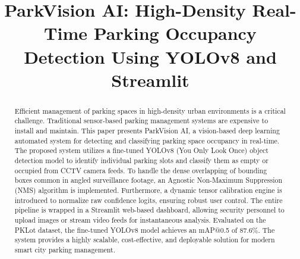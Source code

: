 \documentclass[conference]{IEEEtran}
\begin{document}
\title{ParkVision AI: High-Density Real-Time Parking Occupancy Detection Using YOLOv8 and Streamlit\\}

\author{
\and
{}
\and
{}
\and
{}
}

\maketitle

\begin{abstract}
Efficient management of parking spaces in high-density urban environments is a critical challenge. Traditional sensor-based parking management systems are expensive to install and maintain. This paper presents ParkVision AI, a vision-based deep learning automated system for detecting and classifying parking space occupancy in real-time. The proposed system utilizes a fine-tuned YOLOv8 (You Only Look Once) object detection model to identify individual parking slots and classify them as empty or occupied from CCTV camera feeds. To handle the dense overlapping of bounding boxes common in angled surveillance footage, an Agnostic Non-Maximum Suppression (NMS) algorithm is implemented. Furthermore, a dynamic tensor calibration engine is introduced to normalize raw confidence logits, ensuring robust user control. The entire pipeline is wrapped in a Streamlit web-based dashboard, allowing security personnel to upload images or stream video feeds for instantaneous analysis. Evaluated on the PKLot dataset, the fine-tuned YOLOv8 model achieves an mAP@0.5 of 87.6\%. The system provides a highly scalable, cost-effective, and deployable solution for modern smart city parking management.
\end{abstract}
\end{document}
